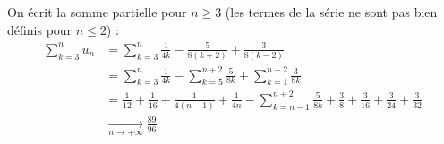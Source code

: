 {\begin{enumerate}
{				On écrit la somme partielle pour $n \geq 3$ (les termes de la série ne sont pas bien définis pour $n \leq 2$) : 
				\begin{align*}
				\sum_{k=3}^{n} u_n &=\sum_{k=3}^{n} \frac{1}{4k}-\frac{5}{8(k+2)}+\frac{3}{8(k-2)} \\
				&=\sum_{k=3}^{n} \frac{1}{4k} - \sum_{k=5}^{n+2} \frac{5}{8k} + \sum_{k=1}^{n-2} \frac{3}{8k}     \\
				&= \frac{1}{12} + \frac{1}{16} + \frac{1}{4(n-1)} +  \frac{1}{4n} - \sum_{k=n-1}^{n+2} \frac{5}{8k} + \frac{3}{8} + \frac{3}{16} + \frac{3}{24} + \frac{3}{32} \\
				& \underset{n \rightarrow+\infty}{\longrightarrow} \frac{89}{96}
				\end{align*}
				
			} 
		\end{enumerate}

}
